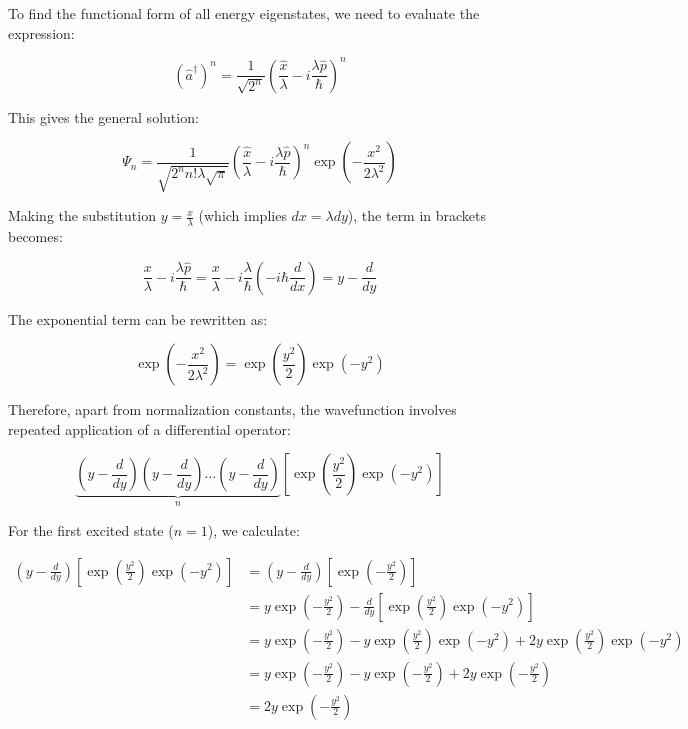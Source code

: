 \documentclass[italian]{HKNdocument}
\begin{document}
To find the functional form of all energy eigenstates, we need to evaluate the expression:

\begin{equation*}
(\hat{a}^\dagger)^n = \frac{1}{\sqrt{2^n}}\left(\frac{\hat{x}}{\lambda} - i\frac{\lambda\hat{p}}{\hbar}\right)^n \tag{5.44}
\end{equation*}

This gives the general solution:

\begin{equation*}
\Psi_n = \frac{1}{\sqrt{2^n n!\lambda\sqrt{\pi}}}\left(\frac{\hat{x}}{\lambda} - i\frac{\lambda\hat{p}}{\hbar}\right)^n\exp\left(-\frac{x^2}{2\lambda^2}\right) \tag{5.45}
\end{equation*}

Making the substitution $y = \frac{x}{\lambda}$ (which implies $dx = \lambda dy$), the term in brackets becomes:

\begin{equation*}
\frac{x}{\lambda} - i\frac{\lambda\hat{p}}{\hbar} = \frac{x}{\lambda} - i\frac{\lambda}{\hbar}\left(-i\hbar\frac{d}{dx}\right) = y - \frac{d}{dy} \tag{5.46}
\end{equation*}

The exponential term can be rewritten as:

\begin{equation*}
\exp\left(-\frac{x^2}{2\lambda^2}\right) = \exp\left(\frac{y^2}{2}\right)\exp(-y^2) \tag{5.47}
\end{equation*}

Therefore, apart from normalization constants, the wavefunction involves repeated application of a differential operator:

\begin{equation*}
\underbrace{\left(y - \frac{d}{dy}\right)\left(y - \frac{d}{dy}\right)\ldots\left(y - \frac{d}{dy}\right)}_{n}\left[\exp\left(\frac{y^2}{2}\right)\exp(-y^2)\right] \tag{5.48}
\end{equation*}

For the first excited state ($n=1$), we calculate:

\begin{align*}
\left(y-\frac{d}{dy}\right)\left[\exp\left(\frac{y^2}{2}\right)\exp(-y^2)\right] &= \left(y-\frac{d}{dy}\right)\left[\exp\left(-\frac{y^2}{2}\right)\right] \\
&= y\exp\left(-\frac{y^2}{2}\right) - \frac{d}{dy}\left[\exp\left(\frac{y^2}{2}\right)\exp(-y^2)\right] \\
&= y\exp\left(-\frac{y^2}{2}\right) - y\exp\left(\frac{y^2}{2}\right)\exp(-y^2) + 2y\exp\left(\frac{y^2}{2}\right)\exp(-y^2) \\
&= y\exp\left(-\frac{y^2}{2}\right) - y\exp\left(-\frac{y^2}{2}\right) + 2y\exp\left(-\frac{y^2}{2}\right) \\
&= 2y\exp\left(-\frac{y^2}{2}\right) \tag{5.49}
\end{align*}
\end{document}
